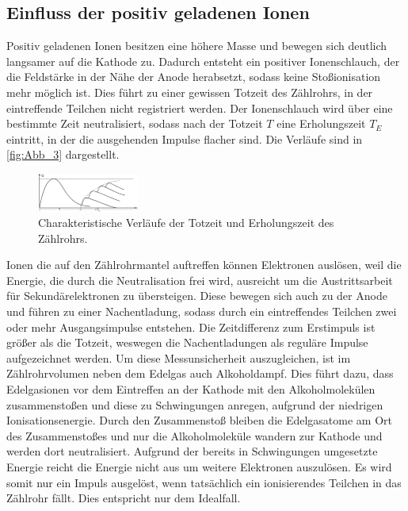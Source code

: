 \subsection{Einfluss der positiv geladenen Ionen}
\label{subsec:Einfluss}
Positiv geladenen Ionen besitzen eine höhere Masse und bewegen sich deutlich 
langsamer auf die Kathode zu. Dadurch entsteht ein positiver Ionenschlauch, der die Feldstärke
in der Nähe der Anode herabsetzt, sodass keine Stoßionisation mehr möglich ist. Dies führt 
zu einer gewissen Totzeit des Zählrohrs, in der eintreffende Teilchen nicht registriert werden.
Der Ionenschlauch wird über eine bestimmte Zeit neutralisiert, sodass nach der Totzeit $T$
eine Erholungszeit $T_E$ eintritt, in der die ausgehenden Impulse flacher sind. 
Die Verläufe sind in \autoref{fig:Abb_3} dargestellt.
\begin{figure}[H]
    \centering
    \includegraphics[width=0.3\textwidth]{Abbildungen/Abb_3.png}
    \caption{Charakteristische Verläufe der Totzeit und Erholungszeit des Zählrohrs.\cite{V703}}
    \label{fig:Abb_3}
\end{figure}
Ionen die auf den Zählrohrmantel auftreffen können Elektronen auslösen, weil die Energie,
die durch die Neutralisation frei wird, ausreicht um die Austrittsarbeit für Sekundärelektronen
zu übersteigen. Diese bewegen sich auch zu der Anode und führen zu einer Nachentladung, sodass durch ein eintreffendes
Teilchen zwei oder mehr Ausgangsimpulse entstehen. Die Zeitdifferenz zum Erstimpuls ist größer
als die Totzeit, weswegen die Nachentladungen als reguläre Impulse aufgezeichnet werden. 
Um diese Messunsicherheit auszugleichen, ist im Zählrohrvolumen neben dem Edelgas auch Alkoholdampf.
Dies führt dazu, dass Edelgasionen vor dem Eintreffen an der Kathode mit den Alkoholmolekülen zusammenstoßen
und diese zu Schwingungen anregen, aufgrund der niedrigen Ionisationsenergie.
Durch den Zusammenstoß bleiben die Edelgasatome am Ort des Zusammenstoßes und nur die Alkoholmoleküle wandern zur Kathode
und werden dort neutralisiert. Aufgrund der bereits in Schwingungen umgesetzte Energie reicht die Energie nicht aus 
um weitere Elektronen auszulösen.
Es wird somit nur ein Impuls ausgelöst, wenn tatsächlich ein ionisierendes Teilchen in das Zählrohr fällt.
Dies entspricht nur dem Idealfall.

